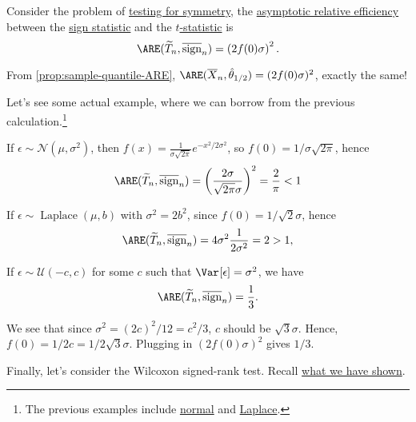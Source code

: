 \begin{proposition}
	Consider the problem of \hyperref[prb:testing-symmetry]{testing for symmetry}, the \hyperref[def:asymptotic-relative-efficiency-statistic]{asymptotic relative efficiency} between the \hyperref[def:sign-statistic]{sign statistic} and the \hyperref[def:t-statistic]{\(t\)-statistic} is
	\[
		\ARE(\widetilde{T} _n, \overline{\mathrm{sign}} _n)
		= \left( 2 f(0) \sigma \right) ^2.
	\]
\end{proposition}

\begin{remark}
	From \autoref{prop:sample-quantile-ARE}, \(\ARE(\overline{X} _n , \hat{\theta} _{1 / 2}) = (2 f(0) \sigma )^2\), exactly the same!
\end{remark}

Let's see some actual example, where we can borrow from the previous calculation.\footnote{The previous examples include \hyperref[eg:ARE-normal]{normal} and \hyperref[eg:ARE-Laplace]{Laplace}.}

\begin{eg}[Gaussian]
	If \(\epsilon \sim \mathcal{N} (\mu , \sigma ^2)\), then \(f(x) = \frac{1}{\sigma \sqrt{2\pi } } e^{- x^2 / 2\sigma ^2}\), so \(f(0) = 1 / \sigma \sqrt{2\pi } \), hence
	\[
		\ARE(\widetilde{T} _n, \overline{\mathrm{sign}} _n)
		= \left( \frac{2\sigma }{\sqrt{2\pi } \sigma } \right) ^2
		= \frac{2}{\pi }
		< 1
	\]
\end{eg}

\begin{eg}[Laplace]
	If \(\epsilon \sim \operatorname{Laplace}(\mu , b) \) with \(\sigma ^2 = 2 b^2\), since \(f(0) = 1 /\sqrt{2} \sigma \), hence
	\[
		\ARE(\widetilde{T} _n, \overline{\mathrm{sign}} _n)
		= 4 \sigma ^2 \frac{1}{2 \sigma ^2}
		= 2
		> 1,
	\]
\end{eg}

\begin{eg}[Uniform]
	If \(\epsilon \sim \mathcal{U} (-c, c)\) for some \(c\) such that \(\Var_{}[\epsilon ] = \sigma ^2\), we have
	\[
		\ARE(\widetilde{T} _n, \overline{\mathrm{sign}} _n)
		= \frac{1}{3}.
	\]
\end{eg}
\begin{explanation}
	We see that since \(\sigma ^2 = (2c)^2 / 12 = c^2 / 3\), \(c\) should be \(\sqrt{3} \sigma\). Hence, \(f(0) = 1 / 2c = 1 / 2 \sqrt{3} \sigma \). Plugging in \((2 f(0) \sigma )^2\) gives \(1 / 3\).
\end{explanation}

Finally, let's consider the Wilcoxon signed-rank test. Recall \hyperref[eg:Wilcoxon-signed-rank-statistic-asymptotic-normality]{what we have shown}.

